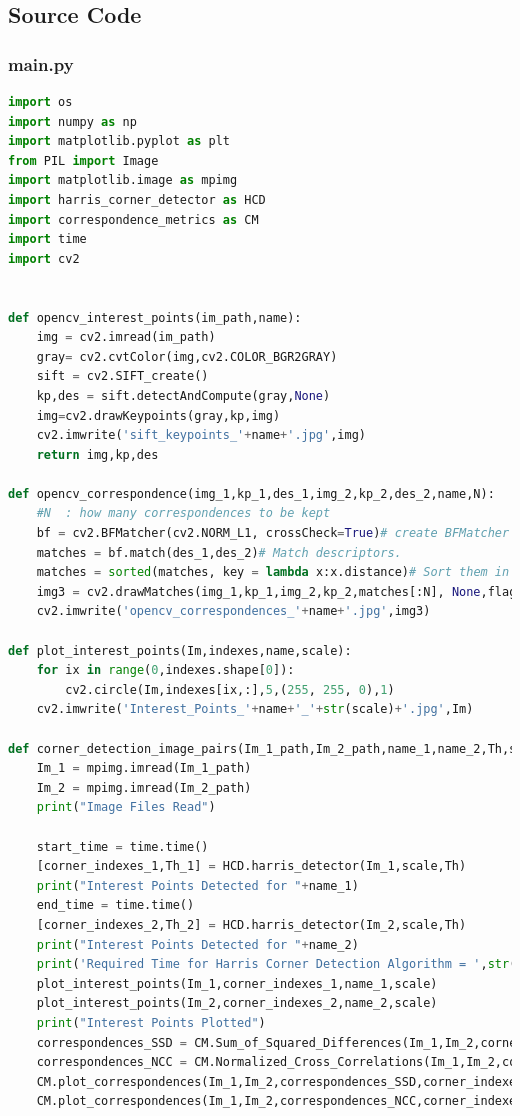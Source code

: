 \documentclass{article}
\begin{document}
\subsection{Source Code}
\subsubsection{main.py}
\begin{lstlisting}[language=Python]
import os
import numpy as np
import matplotlib.pyplot as plt
from PIL import Image
import matplotlib.image as mpimg
import harris_corner_detector as HCD
import correspondence_metrics as CM
import time
import cv2


def opencv_interest_points(im_path,name):
	img = cv2.imread(im_path)
	gray= cv2.cvtColor(img,cv2.COLOR_BGR2GRAY)
	sift = cv2.SIFT_create()
	kp,des = sift.detectAndCompute(gray,None)
	img=cv2.drawKeypoints(gray,kp,img)
	cv2.imwrite('sift_keypoints_'+name+'.jpg',img)
	return img,kp,des

def opencv_correspondence(img_1,kp_1,des_1,img_2,kp_2,des_2,name,N):
	#N 	: how many correspondences to be kept
	bf = cv2.BFMatcher(cv2.NORM_L1, crossCheck=True)# create BFMatcher object
	matches = bf.match(des_1,des_2)# Match descriptors.
	matches = sorted(matches, key = lambda x:x.distance)# Sort them in the order of their distance.
	img3 = cv2.drawMatches(img_1,kp_1,img_2,kp_2,matches[:N], None,flags=2)# Draw first 10 matches.
	cv2.imwrite('opencv_correspondences_'+name+'.jpg',img3)

def plot_interest_points(Im,indexes,name,scale):
	for ix in range(0,indexes.shape[0]):
		cv2.circle(Im,indexes[ix,:],5,(255, 255, 0),1)
	cv2.imwrite('Interest_Points_'+name+'_'+str(scale)+'.jpg',Im)

def corner_detection_image_pairs(Im_1_path,Im_2_path,name_1,name_2,Th,scale):
	Im_1 = mpimg.imread(Im_1_path)
	Im_2 = mpimg.imread(Im_2_path)
	print("Image Files Read")

	start_time = time.time()
	[corner_indexes_1,Th_1] = HCD.harris_detector(Im_1,scale,Th)
	print("Interest Points Detected for "+name_1)
	end_time = time.time()
	[corner_indexes_2,Th_2] = HCD.harris_detector(Im_2,scale,Th)
	print("Interest Points Detected for "+name_2)
	print('Required Time for Harris Corner Detection Algorithm = ',str(end_time-start_time))
	plot_interest_points(Im_1,corner_indexes_1,name_1,scale)
	plot_interest_points(Im_2,corner_indexes_2,name_2,scale)
	print("Interest Points Plotted")
	correspondences_SSD = CM.Sum_of_Squared_Differences(Im_1,Im_2,corner_indexes_1,corner_indexes_2,21)
	correspondences_NCC = CM.Normalized_Cross_Correlations(Im_1,Im_2,corner_indexes_1,corner_indexes_2,21)
	CM.plot_correspondences(Im_1,Im_2,correspondences_SSD,corner_indexes_1,corner_indexes_2,10000,'SSD_'+name_1[:-2]+'_'+str(scale))
	CM.plot_correspondences(Im_1,Im_2,correspondences_NCC,corner_indexes_1,corner_indexes_2,10000,'NCC_'+name_1[:-2]+'_'+str(scale))



\end{lstlisting}
\end{document}
